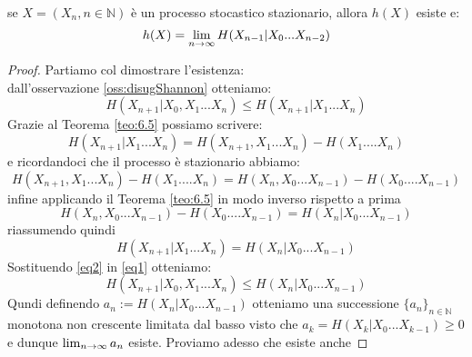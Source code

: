 \begin{teo}
se $X=(X_n,n\in \mathbb{N})$ è un processo stocastico stazionario, allora $h(X)$ esiste e:
\begin{equation}
h(X)=\lim_{n\to \infty} H(X_{n-1}|X_0...X_{n-2})
\end{equation}
\end{teo}
\begin{proof}
Partiamo col dimostrare l'esistenza:\\
dall'osservazione \ref{oss:disugShannon} otteniamo:
\begin{equation} \label{eq1}
H(X_{n+1}|X_0,X_1...X_n) \leq H(X_{n+1}|X_1...X_n)
\end{equation}
Grazie al Teorema \ref{teo:6.5} possiamo scrivere:
$$H(X_{n+1}|X_1...X_n)=H(X_{n+1},X_1...X_n) - H(X_1....X_n)$$
e ricordandoci che il processo è stazionario abbiamo:
$$H(X_{n+1},X_1...X_n) - H(X_1....X_n)= H(X_{n},X_0...X_{n-1}) - H(X_0....X_{n-1})$$
infine applicando il Teorema \ref{teo:6.5} in modo inverso rispetto a prima
$$H(X_{n},X_0...X_{n-1}) - H(X_0....X_{n-1})=H(X_{n}|X_0...X_{n-1})$$
riassumendo quindi
\begin{equation} \label{eq2}
H(X_{n+1}|X_1...X_n)=H(X_{n}|X_0...X_{n-1})
\end{equation}
Sostituendo \ref{eq2} in \ref{eq1} otteniamo:
\begin{equation}
H(X_{n+1}|X_0,X_1...X_n) \leq H(X_{n}|X_0...X_{n-1})
\end{equation}
Qundi definendo $a_n :=  H(X_{n}|X_0...X_{n-1})$ otteniamo una successione $\{ a_n \}_{n\in \mathbb{N}}$ monotona non crescente limitata dal basso visto che $a_k=H(X_{k}|X_0...X_{k-1})\geq 0$ e dunque $\lim_{n\to \infty} a_n$ esiste.
Proviamo adesso che esiste anche 
\end{proof}



